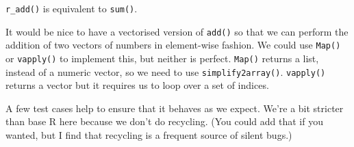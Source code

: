 \texttt{r\_add()} is equivalent to \texttt{sum()}.

It would be nice to have a vectorised version of \texttt{add()} so that
we can perform the addition of two vectors of numbers in element-wise
fashion. We could use \texttt{Map()} or \texttt{vapply()} to implement
this, but neither is perfect. \texttt{Map()} returns a list, instead of
a numeric vector, so we need to use \texttt{simplify2array()}.
\texttt{vapply()} returns a vector but it requires us to loop over a set
of indices.

\begin{Shaded}
\begin{Highlighting}[]
\StringTok{ } \NormalTok{) \{}
  \NormalTok{(}\StringTok{ }
  \StringTok{ }\NormalTok{) }\NormalTok{(}\NormalTok{())}
  \NormalTok{(}
     
  \NormalTok{)}
\NormalTok{\}}

\StringTok{ } \NormalTok{) \{}
  \NormalTok{(}\StringTok{ }
  \NormalTok{(} 
    \NormalTok{(}\NormalTok{))}
\NormalTok{\}}
\end{Highlighting}
\end{Shaded}

A few test cases help to ensure that it behaves as we expect. We're a
bit stricter than base R here because we don't do recycling. (You could
add that if you wanted, but I find that recycling is a frequent source
of silent bugs.)

